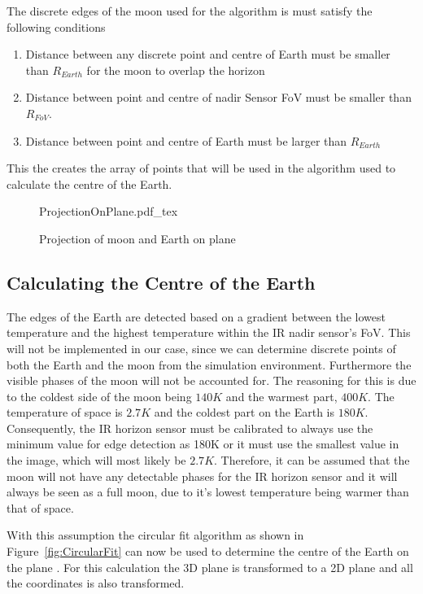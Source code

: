 The discrete edges of the moon used for the algorithm is must satisfy the following conditions
\begin{enumerate}
	\item Distance between any discrete point and centre of Earth must be smaller than $R_{Earth}$ for the moon to overlap the horizon
	\item Distance between point and centre of nadir Sensor FoV must be smaller than $R_{FoV}$.
	\item Distance between point and centre of Earth must be larger than $R_{Earth}$
\end{enumerate}

This the creates the array of points that will be used in the algorithm used to calculate the centre of the Earth.

\begin{figure}[!hbt]
	\centering
	\def\svgwidth{14cm}
	{ProjectionOnPlane.pdf_tex}
	\caption{Projection of moon and Earth on plane}
	\label{fig:ProjectionOnPlane}
\end{figure}

\subsection{Calculating the Centre of the Earth}
\label{section: Calculating the Centre of the Earth}
The edges of the Earth are detected based on a gradient between the lowest temperature and the highest temperature within the IR nadir sensor's FoV. This will not be implemented in our case, since we can determine discrete points of both the Earth and the moon from the simulation environment. Furthermore the visible phases of the moon will not be accounted for. The reasoning for this is due to the coldest side of the moon being $140K$ and the warmest part, $400K$. The temperature of space is $2.7K$ and the coldest part on the Earth is $180K$. Consequently, the IR horizon sensor must be calibrated to always use the minimum value for edge detection as 180K or it must use the smallest value in the image, which will most likely be $2.7K$. Therefore, it can be assumed that the moon will not have any detectable phases for the IR horizon sensor and it will always be seen as a full moon, due to it's lowest temperature being warmer than that of space. 

With this assumption the circular fit algorithm as shown in Figure~\ref{fig:CircularFit} can now be used to determine the centre of the Earth on the plane \cite{Wessels2018}. For this calculation the 3D plane is transformed to a 2D plane and all the coordinates is also transformed.  


